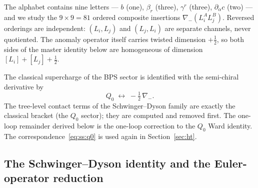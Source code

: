 The alphabet contains nine letters --- $b$ (one), $\beta_r$ (three), $\gamma^r$
(three), $\partial_{\dot\alpha}c$ (two) --- and we study the $9\times9=81$
ordered composite insertions $\nabla_-(L_i^A L_j^B)$. Reversed orderings are
independent: $(L_i,L_j)$ and $(L_j,L_i)$ are separate channels, never
quotiented. The anomaly operator itself carries twisted dimension $+\tfrac12$,
so both sides of the master identity below are homogeneous of dimension
$[L_i]+[L_j]+\tfrac12$.

\begin{remark}\label{rem:ss:q0}
The classical supercharge of the BPS sector is identified with the semi-chiral
derivative by
\begin{equation}\label{eq:ss:q0}
Q_0 \;\longleftrightarrow\; -\tfrac12\,\nabla_{-} .
\end{equation}
The tree-level contact terms of the Schwinger--Dyson family are exactly the
classical bracket (the $Q_0$ sector); they are computed and removed first. The
one-loop remainder derived below is the one-loop correction to the $Q_0$ Ward
identity. The correspondence~\eqref{eq:ss:q0} is used again in
Section~\ref{sec:ht}.
\end{remark}

\subsection{The Schwinger--Dyson identity and the Euler-operator reduction}%
\label{sec:superspace:sd}

